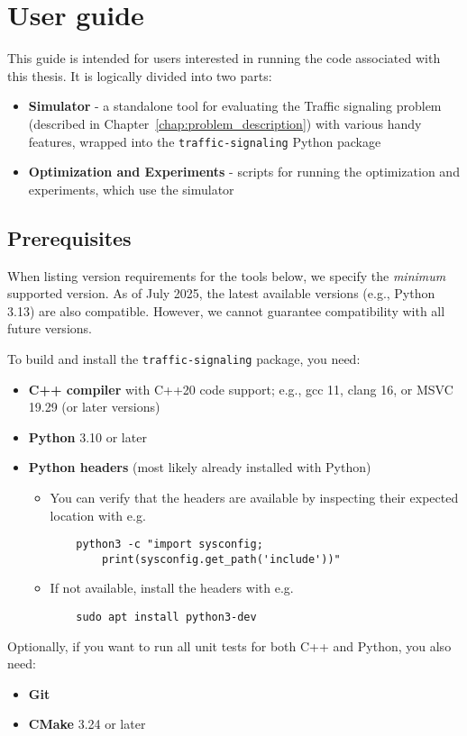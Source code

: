 \chapter{User guide} \label{chap:user_guide}

This guide is intended for users interested in running the code associated with this thesis. It is logically divided into two parts:
\begin{itemize}
    \item \textbf{Simulator} - a standalone tool for evaluating the Traffic signaling problem (described in Chapter~\ref{chap:problem_description}) with various handy features, wrapped into the \verb|traffic-signaling| Python package
    \item \textbf{Optimization and Experiments} - scripts for running the optimization and experiments, which use the simulator
\end{itemize}

\section{Prerequisites}

When listing version requirements for the tools below, we specify the \textit{minimum} supported version. As of July 2025, the latest available versions (e.g., Python 3.13) are also compatible. However, we cannot guarantee compatibility with all future versions.

\bigskip

To build and install the \verb|traffic-signaling| package, you need:
\begin{itemize}
    \item \textbf{C++ compiler} with C++20 code support; e.g., gcc 11, clang 16, or MSVC 19.29 (or later versions)
    \item \textbf{Python} 3.10 or later
    \item \textbf{Python headers} (most likely already installed with Python)
    \begin{itemize}
        \item You can verify that the headers are available by inspecting their expected location with e.g.
\begin{verbatim}
    python3 -c "import sysconfig;
        print(sysconfig.get_path('include'))"
\end{verbatim}
        \item If not available, install the headers with e.g.
\begin{verbatim}
    sudo apt install python3-dev
\end{verbatim}
    \end{itemize}
\end{itemize}
Optionally, if you want to run all unit tests for both C++ and Python, you also need:
\begin{itemize}
    \item \textbf{Git}
    \item \textbf{CMake} 3.24 or later
\end{itemize}

